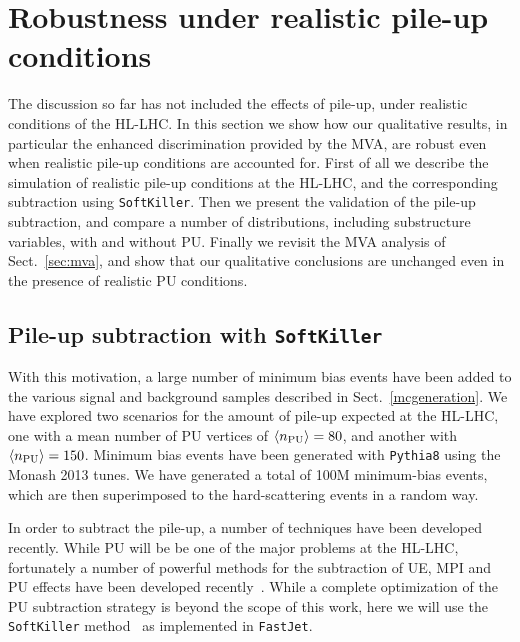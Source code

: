 
\section{Robustness under realistic pile-up conditions}

\label{sec:pileup}

The discussion so far has not included the effects of
pile-up, under realistic conditions of the HL-LHC.
%
In this section we show how our qualitative results, in particular
the enhanced discrimination provided by the MVA, are robust
even when realistic pile-up conditions are accounted for.
%
First of all we describe the simulation of realistic
pile-up conditions at the HL-LHC, and the corresponding
subtraction using {\tt SoftKiller}.
%
Then we present the validation of the pile-up subtraction,
and compare a number of distributions, including substructure variables,
with and without PU.
%
Finally we revisit the MVA analysis of Sect.~\ref{sec:mva}, and
show that our qualitative conclusions are unchanged even
in the presence of realistic PU conditions.


\subsection{Pile-up subtraction with {\tt SoftKiller}}


With this motivation, a large number
of minimum bias events have been added to the various signal
and background samples described in Sect.~\ref{mcgeneration}.
%
We have explored two scenarios for the amount of pile-up expected
at the HL-LHC, one with a mean number of
PU vertices of $\left\langle n_{\rm PU}\right\rangle=80$, and another
with $\left\langle n_{\rm PU}\right\rangle=150$.
%
Minimum bias events have been generated with {\tt Pythia8} using
the Monash 2013 tunes.
%
We have generated a total of 100M minimum-bias events, which are
then superimposed to the hard-scattering events in a random way.

In order to subtract the pile-up, a number of techniques
have been developed recently. While PU will be be one of the major problems at the HL-LHC, fortunately
a number of powerful methods for the subtraction of  UE, MPI and PU
effects 
have been developed recently~\cite{Cacciari:2009dp,TheATLAScollaboration:2013pia,Butterworth:2008iy,Cacciari:2007fd,Krohn:2009th,Krohn:2013lba,Ellis:2009me,Bertolini:2014bba,Cacciari:2014gra,Cacciari:2014jta,Berta:2014eza,Larkoski:2014wba}.
%
While a complete optimization of the PU subtraction strategy is beyond
the scope of this work, here we will use the {\tt SoftKiller}
method~\cite{Cacciari:2014gra}
as implemented in {\tt FastJet}.



